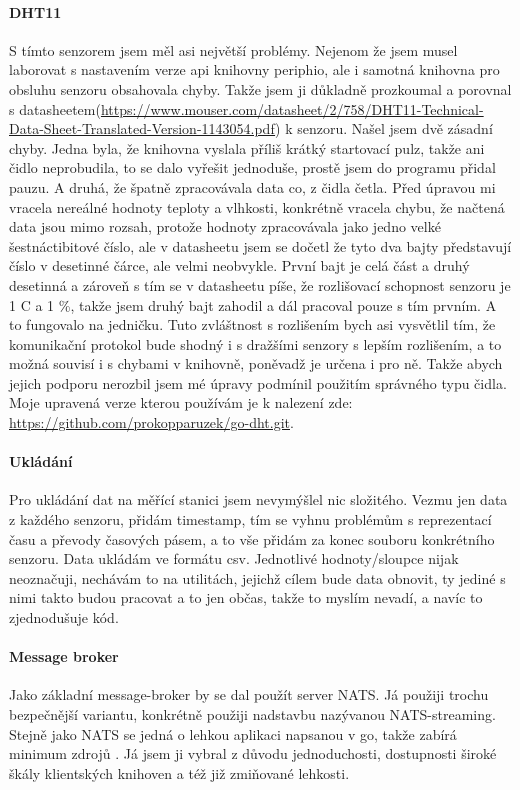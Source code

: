 \paragraph*{DHT11}
S tímto senzorem jsem měl asi největší problémy. Nejenom že jsem musel laborovat s nastavením verze api knihovny 
\gls{periphio}, ale i samotná knihovna pro obsluhu senzoru obsahovala chyby. Takže jsem ji důkladně prozkoumal 
a porovnal s datasheetem(\url{https://www.mouser.com/datasheet/2/758/DHT11-Technical-Data-Sheet-Translated-Version-1143054.pdf}) 
k senzoru. Našel jsem dvě zásadní chyby. Jedna byla, že knihovna vyslala příliš krátký startovací pulz, takže ani čidlo 
neprobudila, to se dalo vyřešit jednoduše, prostě jsem do programu přidal pauzu. A druhá, že špatně zpracovávala data 
co, z čidla četla. Před úpravou mi vracela nereálné hodnoty teploty a vlhkosti, konkrétně vracela chybu, že načtená data 
jsou mimo rozsah, protože hodnoty zpracovávala jako jedno velké šestnáctibitové číslo, ale v datasheetu jsem se dočetl 
že tyto dva bajty představují číslo v desetinné čárce, ale velmi neobvykle. První bajt je celá část a druhý desetinná 
a zároveň s tím se v datasheetu píše, že rozlišovací schopnost senzoru je 1 \textdegree C a 1 \%, takže jsem druhý bajt 
zahodil a dál pracoval pouze s tím prvním. A to fungovalo na jedničku. Tuto zvláštnost s rozlišením bych asi vysvětlil 
tím, že komunikační protokol bude shodný i s dražšími senzory s lepším rozlišením, a to možná souvisí i s chybami 
v knihovně, poněvadž je určena i pro ně. Takže abych jejich podporu nerozbil jsem mé úpravy podmínil použitím správného 
typu čidla. Moje upravená verze kterou používám je k nalezení zde: \url{https://github.com/prokopparuzek/go-dht.git}.

\paragraph*{Ukládání}
Pro ukládání dat na měřící stanici jsem nevymýšlel nic složitého. Vezmu jen data z každého senzoru, přidám 
\gls{timestamp}, tím se vyhnu problémům s reprezentací času a převody časových pásem, a to vše přidám za konec souboru 
konkrétního senzoru. Data ukládám ve formátu \acrshort{csv}. Jednotlivé hodnoty/sloupce nijak neoznačuji, nechávám to na 
utilitách, jejichž cílem bude data obnovit, ty jediné s nimi takto budou pracovat a to jen občas, takže to myslím 
nevadí, a navíc to zjednodušuje kód.

\paragraph*{Message broker}
Jako základní \gls{message-broker} by se dal použít server NATS. Já použiji trochu bezpečnější variantu, konkrétně 
použiji nadstavbu nazývanou NATS-streaming. Stejně jako NATS se jedná o lehkou aplikaci napsanou v \gls{go}, takže 
zabírá minimum zdrojů \parencite{root.cz:NATS-streaming}. Já jsem ji vybral z důvodu jednoduchosti, dostupnosti široké 
škály klientských knihoven a též již zmiňované lehkosti.

